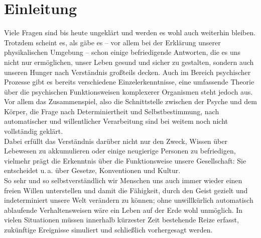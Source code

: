 \documentclass[doc,a4paper,12pt]{apa6}
\begin{document}
\section{Einleitung}

Viele Fragen sind bis heute ungeklärt und werden es wohl auch weiterhin bleiben. Trotzdem scheint es, als gäbe es – vor allem bei der Erklärung unserer physikalischen Umgebung – schon einige befriedigende Antworten, die es uns nicht nur ermöglichen, unser Leben gesund und sicher zu gestalten, sondern auch unseren Hunger nach Verständnis großteils decken. Auch im Bereich psychischer Prozesse gibt es bereits verschiedene Einzelerkenntnisse, eine umfassende Theorie über die psychischen Funktionsweisen komplexerer Organismen steht jedoch aus. Vor allem das Zusammenspiel, also die Schnittstelle zwischen der Psyche und dem Körper, die Frage nach Determiniertheit und Selbstbestimmung, nach automatischer und willentlicher Verarbeitung sind bei weitem noch nicht vollständig geklärt.\\
Dabei erfüllt das Verständnis darüber nicht nur den Zweck, Wissen über Lebewesen zu akkumulieren oder einige neugierige Personen zu befriedigen, vielmehr prägt die Erkenntnis über die Funktionsweise unsere Gesellschaft: Sie entscheidet u.\,a. über Gesetze, Konventionen und Kultur.\\
So sehr und so selbstverständlich wir Menschen uns auch immer wieder einen freien Willen unterstellen und damit die Fähigkeit, durch den Geist gezielt und indeterminiert unsere Welt verändern zu können; ohne unwillkürlich automatisch ablaufende Verhaltensweisen wäre ein Leben auf der Erde wohl unmöglich. In vielen Situationen müssen innerhalb kürzester Zeit bestehende Reize erfasst, zukünftige Ereignisse simuliert und schließlich vorhergesagt werden.
\end{document}
